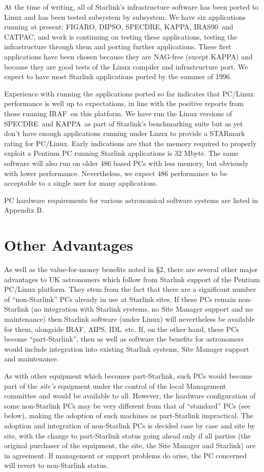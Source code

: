 \documentclass[twoside,11pt]{article}
\newcommand{\htmladdnormallink}[2]{#1}
\newcommand{\xref}[3]{#1}
\newcommand{\CATPAC}{{\small CATPAC}\normalsize}
\newcommand{\DIPSO}{{\small DIPSO}\normalsize}
\newcommand{\FIGARO}{{\small FIGARO}\normalsize}
\newcommand{\IRAS}{{\small IRAS90}\normalsize}
\newcommand{\KAPPA}{{\small KAPPA}\normalsize}
\newcommand{\SPECDRE}{{\small SPECDRE}\normalsize}
\newcommand{\CATPACref}{\xref{\CATPAC}{sun120}{}}
\newcommand{\DIPSOref} {\xref{\DIPSO}{sun50}{}}
\newcommand{\FIGAROref}{\xref{\FIGARO}{sun86}{}}
\newcommand{\IRASref}{\xref{\IRAS}{sun163}{}}
\newcommand{\KAPPAref} {\xref{\KAPPA}{sun239}{}}
\newcommand{\AIPS}{\small{AIPS}\normalsize}
\newcommand{\AIPSref}{\htmladdnormallink{\AIPS}{http://www.aips.nrao.edu/}}
\newcommand{\IDL}{\small{IDL}\normalsize}
\newcommand{\IDLref}{\htmladdnormallink{\IDL}{http://rsinc.com/idl/}}
\newcommand{\IRAF}{\small{IRAF}\normalsize}
\newcommand{\IRAFref}{\htmladdnormallink{\IRAF}{http://iraf.noao.edu/iraf-homepage.html}}
\begin{document}
At the time of writing, all of Starlink's infrastructure software has
been ported to Linux and has been tested subsystem by subsystem.  We
have six applications running at present: \FIGAROref, \DIPSOref, 
\SPECDRE, \KAPPAref, \IRASref\ and \CATPACref, and work is continuing 
on testing these applications, testing
the infrastructure through them and porting further applications.
These first applications have been chosen because they
are NAG-free (except \KAPPA) and because they are good tests of the
Linux compiler and infrastructure port. We expect to have most
Starlink applications ported by the summer of 1996.

Experience with running the applications ported so far indicates that
PC/Linux performance is well up to expectations, in line with the
positive reports from those running \IRAFref\ on this platform.  We have run
the Linux versions of \SPECDRE\ and \KAPPA\ as part of Starlink's
benchmarking suite but as yet don't have enough applications running
under Linux to provide a STARmark rating for PC/Linux.  Early
indications are that the memory required to properly exploit a Pentium
PC running Starlink applications is 32 Mbyte.  The same software will
also run on older 486 based PCs with less memory, but obviously with
lower performance.  Nevertheless, we expect 486 performance to be
acceptable to a single user for many applications.

PC hardware requirements for various astronomical software systems are
listed in Appendix B. 

\section{Other Advantages}

As well as the value-for-money benefits noted in \S 2, there are
several other major advantages to UK astronomers which follow from
Starlink support of the Pentium PC/Linux platform.  They stem from the
fact that there are a significant number of ``non-Starlink'' PCs
already in use at Starlink sites.  If these PCs remain non-Starlink
(no integration with Starlink systems, no Site Manager support and no
maintenance) then Starlink software (under Linux) will nevertheless be
available for them, alongside \IRAFref, \AIPSref, \IDLref\ etc.  If, 
on the other
hand, these PCs become ``part-Starlink'', then as well as software the
benefits for astronomers would include integration into existing
Starlink systems, Site Manager support and maintenance.

As with other equipment which becomes part-Starlink, such PCs would
become part of the {\em site's} equipment under the control of the
local Management committee and would be available to
all.  However, the hardware configuration of some non-Starlink PCs may
be very different from that of ``standard'' PCs (see below), making the
adoption of such machines as part-Starlink impractical.  The
adoption and integration of non-Starlink PCs is decided case by case
and site by site, with the change to part-Starlink status going ahead
only if all parties (the original purchaser of the equipment, the site,
the Site Manager and Starlink) are in agreement.  If management or
support problems do arise, the PC concerned will revert to
non-Starlink status.
\end{document}
